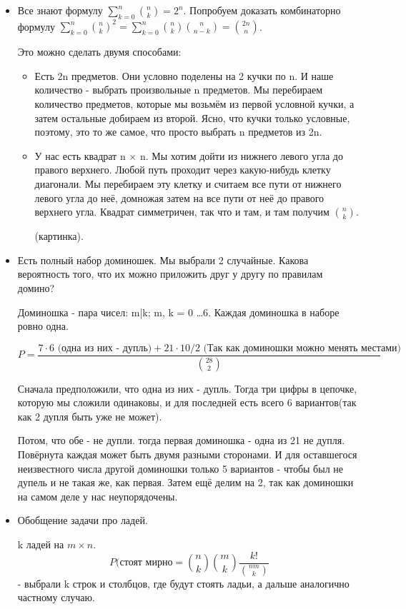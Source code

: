 \begin{itemize}
	\item Все знают формулу $\sum\limits_{k = 0}^{n} \binom{n}{k} = 2^n$. Попробуем доказать комбинаторно формулу $\sum\limits_{k = 0}^n \binom{n}{k}^2 = \sum\limits_{k = 0}^n \binom{n}{k}\binom{n}{n - k} = \binom{2n}{n}$.
	
	Это можно сделать двумя способами:
	\begin{itemize}
		\item Есть 2n предметов. Они условно поделены на 2 кучки по n. И наше количество - выбрать произвольные n предметов. Мы перебираем количество предметов, которые мы возьмём из первой условной кучки, а затем остальные добираем из второй. Ясно, что кучки только условные, поэтому, это то же самое, что просто выбрать n предметов из 2n.
		\item  У нас есть квадрат n $\times$ n. Мы хотим дойти из нижнего левого угла до правого верхнего. Любой путь проходит через какую-нибудь клетку диагонали. Мы перебираем эту клетку и считаем все пути от нижнего левого угла до неё, домножая затем на все пути от неё до правого верхнего угла. Квадрат симметричен, так что и там, и там получим $\binom{n}{k}$.
		
		(картинка).
	\end{itemize}
	\item Есть полный набор доминошек. Мы выбрали 2 случайные. Какова вероятность того, что их можно приложить друг у другу по правилам домино?
	
	Доминошка - пара чисел: m|k; m, k = 0 \dots 6. Каждая доминошка в наборе ровно одна.
	
	\[P = \frac{7\cdot6 \text{ (одна из них - дупль)} + 21\cdot 10/2 \text{ (Так как доминошки можно менять местами)}}{\binom{28}{2}}\] 
	
	Сначала предположили, что одна из них - дупль. Тогда три цифры в цепочке, которую мы сложили одинаковы, и для последней есть всего 6 вариантов(так как 2 дупля быть уже не может).
	
	Потом, что обе - не дупли. тогда первая доминошка - одна из 21 не дупля. Повёрнута каждая может быть двумя разными сторонами. И для оставшегося неизвестного числа другой доминошки только 5 вариантов - чтобы был не дупель и не такая же, как первая. Затем ещё делим на 2, так как доминошки на самом деле у нас неупорядочены.
	
	\item Обобщение задачи про ладей.
	
	k ладей на $m \times n$. 
	\[P(\text{стоят мирно} = \binom{n}{k} \binom{m}{k} \frac{k!}{\binom{nm}{k}}\] - выбрали k строк и столбцов, где будут стоять ладьи, а дальше аналогично частному случаю.
	

\end{itemize}

